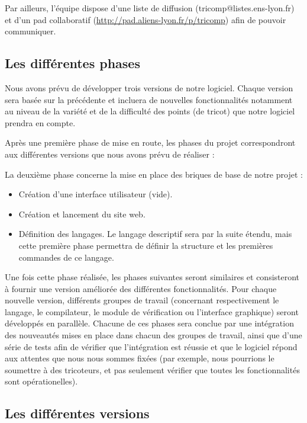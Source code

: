 \documentclass{article}
\begin{document}
Par ailleurs, l'équipe dispose d'une liste de diffusion (tricomp@listes.ens-lyon.fr) et d'un pad collaboratif (\url{http://pad.aliens-lyon.fr/p/tricomp}) afin de pouvoir communiquer.

\subsection{Les différentes phases}

Nous avons prévu de développer trois versions de notre logiciel. Chaque version sera basée sur la précédente et incluera de nouvelles 
fonctionnalités notamment au niveau de la variété et de la difficulté des points (de tricot) que notre logiciel prendra en compte. \newline

Après une première phase de mise en route, les phases du projet correspondront aux différentes versions que nous avons prévu de réaliser :

La deuxième phase concerne la mise en place des briques de base de notre projet :
    \begin{itemize}
     \item Création d'une interface utilisateur (vide).
     \item Création et lancement du site web.
     \item Définition des langages. Le langage descriptif sera par la suite étendu, mais cette première phase permettra de définir la 
structure et les premières commandes de ce langage.
    \end{itemize}

Une fois cette phase réalisée, les phases suivantes seront similaires et consisteront à fournir une version améliorée des 
différentes fonctionnalités. Pour chaque nouvelle version, différents groupes de travail (concernant respectivement le langage, le 
compilateur, le module de vérification ou l'interface graphique) seront développés en parallèle. Chacune de ces phases sera conclue 
par une intégration des nouveautés mises en place dans chacun des groupes de travail, ainsi que d'une série de tests afin de vérifier que 
l'intégration est réussie et que le logiciel répond aux attentes que nous nous sommes fixées (par exemple, nous pourrions le soumettre
à des tricoteurs, et pas seulement vérifier que toutes les fonctionnalités sont opérationelles).


\subsection{Les différentes versions}
\end{document}
